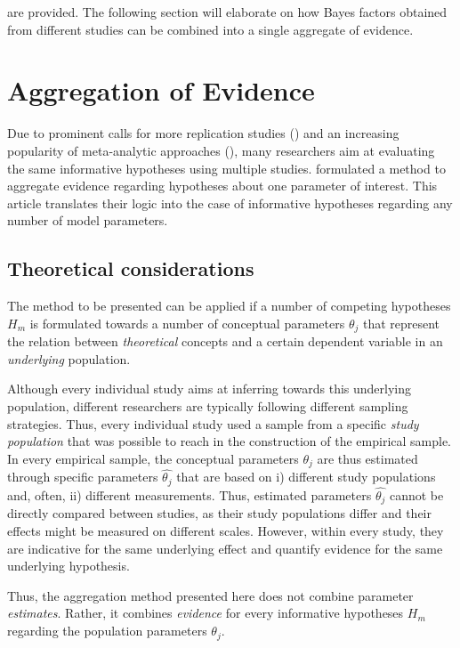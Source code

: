 \documentclass[11pt, a4paper]{article} %
\begin{document}
\noindent are provided. The following section will elaborate on how Bayes factors obtained from different studies can be combined into a single aggregate of evidence. 


\section{Aggregation of Evidence}
Due to prominent calls for more replication studies (\citet{aac4716}) and an increasing popularity of meta-analytic approaches (\citet*{doi:10.1177/0956797613504966}), many researchers aim at evaluating the same informative hypotheses using multiple studies. \citet{Kuiper2013} formulated a method to aggregate evidence regarding hypotheses about one parameter of interest. This article translates their logic into the case of informative hypotheses regarding any number of model parameters.  

\subsection{Theoretical considerations}

\noindent The method to be presented can be applied if a number of competing hypotheses $H_m$ is formulated towards a number of conceptual parameters $\theta_j$ that represent the relation between \textit{theoretical} concepts and a certain dependent variable in an \textit{underlying} population.

Although every individual study aims at inferring towards this underlying population, different researchers are typically following different sampling strategies. Thus, every individual study used a sample from a specific \textit{study population} that was possible to reach in the construction of the empirical sample. In every empirical sample, the conceptual parameters $\theta_j$ are thus estimated through specific parameters $\hat{\theta_j}$ that are based on i) different study populations and, often, ii) different measurements. Thus, estimated parameters $\hat{\theta_j}$ cannot be directly compared between studies, as their  study populations differ and their effects might be measured on different scales. However, within every study, they are indicative for the same underlying effect and quantify evidence for the same underlying hypothesis. 

Thus, the aggregation method presented here does not combine parameter \textit{estimates}. Rather, it combines \textit{evidence} for every informative hypotheses $H_m$ regarding the population parameters $\theta_j$.   
\end{document}
